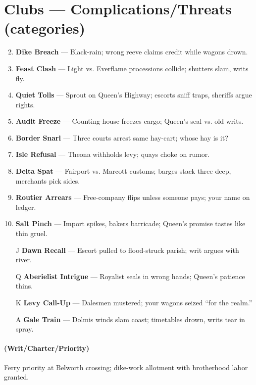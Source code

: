 \section*{Clubs --- Complications/Threats (categories)}
\label{sec:viterra-complications}
\begin{enumerate}
\setcounter{enumi}{1}
\item \textbf{Dike Breach} --- Black-rain; wrong reeve claims credit while wagons drown.
\item \textbf{Feast Clash} --- Light vs. Everflame processions collide; shutters slam, writs fly.
\item \textbf{Quiet Tolls} --- Sprout on Queen's Highway; escorts sniff traps, sheriffs argue rights.
\item \textbf{Audit Freeze} --- Counting-house freezes cargo; Queen's seal vs. old writs.
\item \textbf{Border Snarl} --- Three courts arrest same hay-cart; whose hay is it?
\item \textbf{Isle Refusal} --- Theona withholds levy; quays choke on rumor.
\item \textbf{Delta Spat} --- Fairport vs. Marcott customs; barges stack three deep, merchants pick sides.
\item \textbf{Routier Arrears} --- Free-company flips unless someone pays; your name on ledger.
\item \textbf{Salt Pinch} --- Import spikes, bakers barricade; Queen's promise tastes like thin gruel.
\item[J] \textbf{Dawn Recall} --- Escort pulled to flood-struck parish; writ argues with river.
\item[Q] \textbf{Aberielist Intrigue} --- Royalist seals in wrong hands; Queen's patience thins.
\item[K] \textbf{Levy Call-Up} --- Dalesmen mustered; your wagons seized ``for the realm.''
\item[A] \textbf{Gale Train} --- Dolmis winds slam coast; timetables drown, writs tear in spray.
\end{enumerate}

\paragraph*{(Writ/Charter/Priority)} Ferry priority at Belworth crossing; dike-work allotment with brotherhood labor granted.

